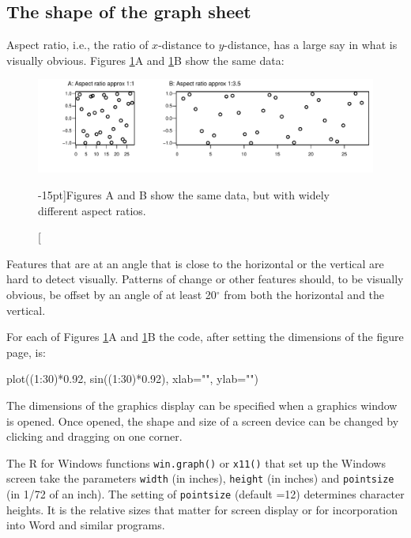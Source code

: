\documentclass{tufte-book}\usepackage[]{graphicx}\usepackage[]{color}
\newcommand{\txtt}[1]{\texttt{#1}}
\begin{document}
\subsection{The shape of the graph sheet}
Aspect ratio, i.e., the ratio of $x$-distance to $y$-distance, has a
large say in what is visually obvious.  Figures \ref{fig:aspect}A and
\ref{fig:aspect}B show the same data:
\begin{figure}
\begin{Schunk}


\centerline{\includegraphics[width=\textwidth]{figs/07-fig8_3e-1} }

\end{Schunk}
\caption[][-15pt]{Figures A and B show the same data, but with widely different
  aspect ratios.\label{fig:aspect}}
\end{figure}
\noindent
Features that are at an angle that is close to the horizontal or the
vertical are hard to detect visually. Patterns of change or other
features should, to be visually obvious, be offset by an angle of
at least 20$^\circ$ from both the horizontal and the vertical.

\noindent For each of Figures \ref{fig:aspect}A and \ref{fig:aspect}B
the code, after setting the dimensions of the figure page, is:
\begin{Schunk}
\begin{Sinput}
plot((1:30)*0.92, sin((1:30)*0.92),
     xlab="", ylab="")
\end{Sinput}
\end{Schunk}

The dimensions of the graphics display can be specified when a
graphics window is opened.  Once opened, the shape and size of a
screen device can be changed by clicking and dragging on one corner.

The R for Windows functions \txtt{win.graph()} or \txtt{x11()} that
set up the Windows screen take the parameters \txtt{width} (in
inches), \txtt{height} (in inches) and \txtt{pointsize} (in 1/72 of an
inch). The setting of \txtt{pointsize} (default =12) determines
character heights. It is the relative sizes that matter for screen
display or for incorporation into Word and similar programs.
\end{document}
